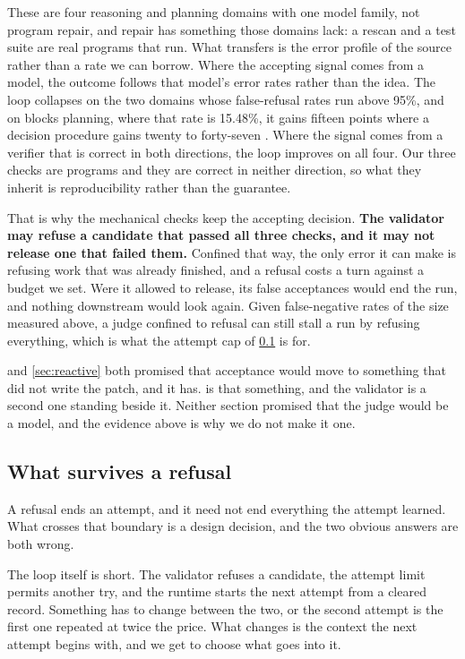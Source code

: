 These are four reasoning and planning domains with one model family, not program repair, and repair
has something those domains lack: a rescan and a test suite are real programs that run. What
transfers is the error profile of the source rather than a rate we can borrow. Where the accepting
signal comes from a model, the outcome follows that model's error rates rather than the idea. The
loop collapses on the two domains whose false-refusal rates run above 95\%, and on blocks planning, where that rate is
15.48\%, it gains fifteen points where a decision procedure gains twenty to forty-seven
\citep[Tables~1 and 2]{stechly2025selfverification}. Where the signal comes from a verifier that is
correct in both directions, the loop improves on all four. Our three checks are programs and they
are correct in neither direction, so what they inherit is reproducibility rather than the
guarantee.

That is why the mechanical checks keep the accepting decision. \textbf{The validator may refuse a candidate that
passed all three checks, and it may not release one that failed them.} Confined that way, the only
error it can make is refusing work that was already finished, and a refusal costs a turn against a
budget we set. Were it allowed to release, its false acceptances would end the run, and nothing
downstream would look again. Given false-negative rates of the size measured above, a judge confined
to refusal can still stall a run by refusing everything, which is what the attempt cap of
\cref{sec:reflection} is for.

 and \cref{sec:reactive} both promised that acceptance would move to something that
did not write the patch, and it has.  is that something, and the validator is a
second one standing beside it. Neither section promised that the judge would be a model, and the
evidence above is why we do not make it one.

\subsection{What survives a refusal}
\label{sec:reflection}

A refusal ends an attempt, and it need not end everything the attempt learned. What crosses that
boundary is a design decision, and the two obvious answers are both wrong.

The loop itself is short. The validator refuses a candidate, the attempt limit permits another try,
and the runtime starts the next attempt from a cleared record. Something has to change between the
two, or the second attempt is the first one repeated at twice the price. What changes is the
context the next attempt begins with, and we get to choose what goes into it.

